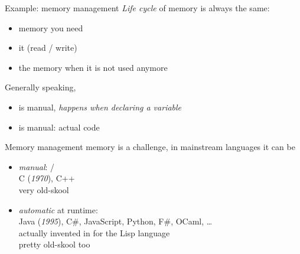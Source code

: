 \documentclass[10pt]{beamer}
\begin{document}
\begin{frame}{Example: memory management}
  \emph{Life cycle} of memory is always the same:
  \smallskip
  \begin{itemize}
    \item {} memory you need
    \item {} it (read / write)
    \item {} the memory when it is not used anymore
  \end{itemize}
  \medskip

  Generally speaking,
  \begin{itemize}
    \item {} is manual,
      \emph{happens when declaring a variable}
    \item {} is manual: actual code
  \end{itemize}
\end{frame}



\begin{frame}{Memory management}
   memory is a challenge, in mainstream languages it can be
  \medskip
  \begin{itemize}\bigsep
    \item \emph{manual}:  / \\
      \prompt C (\emph{1970}), C++\\
      very old-skool
    \item \emph{automatic} at runtime: \\
      \prompt Java (\emph{1995}), C\#, JavaScript, Python, F\#, OCaml, \ldots\\
      \pause
      actually invented in  for the Lisp language\\
      pretty old-skool too
  \end{itemize}
\end{frame}
\end{document}
